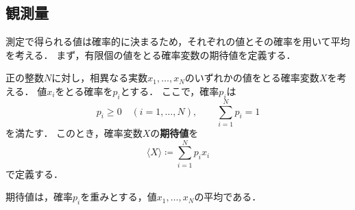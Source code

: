 \subsection{観測量}
\label{subsec:observables}

測定で得られる値は確率的に決まるため，それぞれの値とその確率を用いて平均を考える．
まず，有限個の値をとる確率変数の期待値を定義する．

\begin{defi}[期待値]
\label{def:expectation}
正の整数$N$に対し，相異なる実数$x_1,\ldots,x_N$のいずれかの値をとる確率変数$X$を考える．
値$x_i$をとる確率を$p_i$とする．
ここで，確率$p_i$は
\begin{equation*}
  p_i\geq 0\quad(i=1,\ldots,N),
  \qquad
  \sum_{i=1}^{N}p_i=1
\end{equation*}
を満たす．
このとき，確率変数$X$の\textbf{期待値}を
\begin{equation}
  \langle X\rangle\coloneq\sum_{i=1}^{N}p_i x_i
  \label{eq:expectation-finite-distribution}
\end{equation}
で定義する．
\end{defi}

期待値は，確率$p_i$を重みとする，値$x_1,\ldots,x_N$の平均である．




